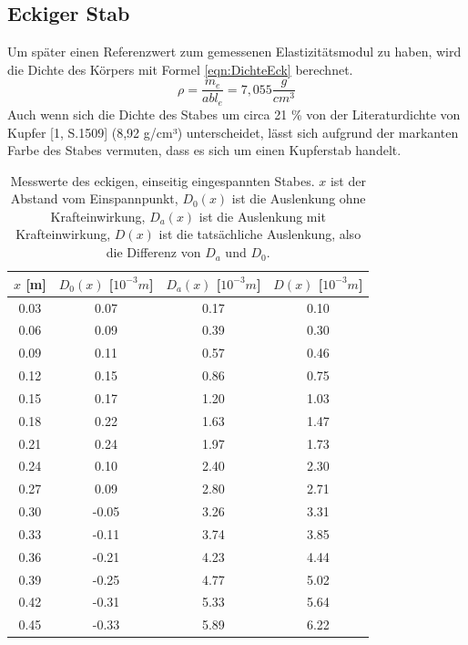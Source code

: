 \documentclass[titlepage = firstcover]{scrartcl}
\begin{document}
      \subsection{Eckiger Stab}
        Um später einen Referenzwert zum gemessenen Elastizitätsmodul zu haben, wird die Dichte des Körpers mit Formel \ref{eqn:DichteEck} berechnet.
        \begin{equation}
          \rho = \frac{m_e}{a b l_e} = 7,055 \frac{g}{cm^3}
          \label{eqn:DichteEck}
        \end{equation}
        Auch wenn sich die Dichte des Stabes um circa 21 \% von der Literaturdichte von Kupfer [1, S.1509] (8,92 g/cm³) unterscheidet, lässt sich aufgrund der
        markanten Farbe des Stabes vermuten, dass es sich um einen Kupferstab handelt.    
        \begin{table}[h]
          \centering
          \caption{Messwerte des eckigen, einseitig eingespannten Stabes.
                   $x$ ist der Abstand vom Einspannpunkt,
                   $D_0(x)$ ist die Auslenkung ohne Krafteinwirkung,
                   $D_a(x)$ ist die Auslenkung mit Krafteinwirkung,
                   $D(x)$ ist die tatsächliche Auslenkung, also die Differenz von $D_a$ und $D_0$.}
          \label{tab:tabEeins}
          \begin{tabular}{c c c c}
            \toprule
            {$x$ [m]} & {$D_0(x)$ [$10^{-3}m$]} & {$D_a(x)$ [$10^{-3}m$]} & {$D(x)$ [$10^{-3}m$]}\\
            \midrule
            0.03 & 0.07 & 0.17 & 0.10\\
            0.06 & 0.09 & 0.39 & 0.30\\
            0.09 & 0.11 & 0.57 & 0.46\\
            0.12 & 0.15 & 0.86 & 0.75\\
            0.15 & 0.17 & 1.20 & 1.03\\
            0.18 & 0.22 & 1.63 & 1.47\\
            0.21 & 0.24 & 1.97 & 1.73\\
            0.24 & 0.10 & 2.40 & 2.30\\
            0.27 & 0.09 & 2.80 & 2.71\\
            0.30 &-0.05 & 3.26 & 3.31\\
            0.33 &-0.11 & 3.74 & 3.85\\
            0.36 &-0.21 & 4.23 & 4.44\\
            0.39 &-0.25 & 4.77 & 5.02\\
            0.42 &-0.31 & 5.33 & 5.64\\
            0.45 &-0.33 & 5.89 & 6.22\\
            \bottomrule            
          \end{tabular}
        \end{table}
\end{document}

